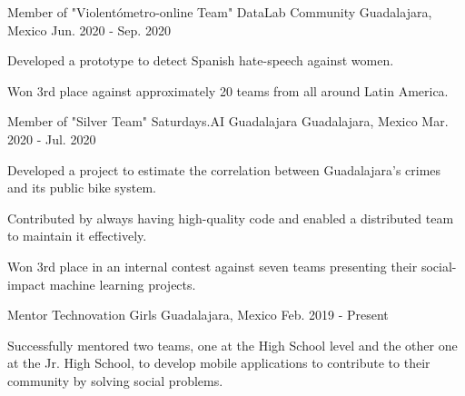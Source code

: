 

\begin{cventries}

  \cventry
    {Member of "Violentómetro-online Team"} %
    {DataLab Community} %
    {Guadalajara, Mexico} %
    {Jun. 2020 - Sep. 2020} %
    {
      \begin{cvitems} %
        \item {Developed a prototype to detect Spanish hate-speech against women.}
        \item {Won 3rd place against approximately 20 teams from all around Latin America.}
      \end{cvitems}
    }

  \cventry
    {Member of "Silver Team"} %
    {Saturdays.AI Guadalajara} %
    {Guadalajara, Mexico} %
    {Mar. 2020 - Jul. 2020} %
    {
      \begin{cvitems} %
        \item {Developed a project to estimate the correlation between Guadalajara's crimes and its public bike system.}
        \item {Contributed by always having high-quality code and enabled a distributed team to maintain it effectively.}
        \item {Won 3rd place in an internal contest against seven teams presenting their social-impact machine learning projects.}
      \end{cvitems}
    }
    
  \cventry
    {Mentor} %
    {Technovation Girls} %
    {Guadalajara, Mexico} %
    {Feb. 2019 - Present} %
    {
      \begin{cvitems} %
        \item {Successfully mentored two teams, one at the High School level and the other one at the Jr. High School, to develop mobile applications to contribute to their community by solving social problems.}
      \end{cvitems}
    }
    

\end{cventries}
